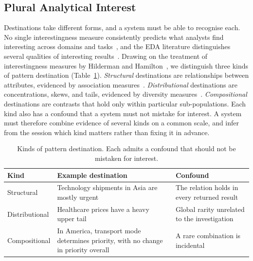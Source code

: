 \documentclass[sigconf]{acmart}
\begin{document}
\subsection{Plural Analytical Interest}
Destinations take different forms, and a system must be able to recognise each. No single interestingness measure consistently predicts what analysts find interesting across domains and tasks~\cite{somechPredictingWhatInteresting2019}, and the EDA literature distinguishes several qualities of interesting results~\cite{chansonInterestingnessMeasuresExploratory2025a}. Drawing on the treatment of interestingness measures by Hilderman and Hamilton~\cite{robertj.hildermanKnowledgeDiscoveryMeasures2001}, we distinguish three kinds of pattern destination (Table~\ref{tab:kinds}). \emph{Structural} destinations are relationships between attributes, evidenced by association measures~\cite{goodman1991rule}. \emph{Distributional} destinations are concentrations, skews, and tails, evidenced by diversity measures~\cite{shannon1948mathematical,gini1921measurement,bergerDiversityPlanktonicForaminifera1970,mcintoshIndexDiversityRelation1967}. \emph{Compositional} destinations are contrasts that hold only within particular sub-populations. Each kind also has a confound that a system must not mistake for interest. A system must therefore combine evidence of several kinds on a common scale, and infer from the session which kind matters rather than fixing it in advance.

\begin{table}[t]
\caption{Kinds of pattern destination. Each admits a confound that should not be mistaken for interest.}
\label{tab:kinds}
\small
\begin{tabularx}{\columnwidth}{@{}p{}XX@{}}
\toprule
Kind & Example destination & Confound \\
\midrule
Structural & Technology shipments in Asia are mostly urgent & The relation holds in every returned result \\
Distributional & Healthcare prices have a heavy upper tail & Global rarity unrelated to the investigation \\
Compositional & In America, transport mode determines priority, with no change in priority overall & A rare combination is incidental \\
\bottomrule
\end{tabularx}
\end{table}
\end{document}

